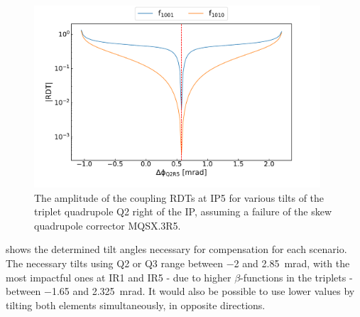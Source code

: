 \begin{figure}[!htb]
    \centering
    \includegraphics*[width=0.95\textwidth]{Figures/IR_Coupling_Correction/ir5_compensate_right_with_q2.pdf}
    \caption{The amplitude of the coupling RDTs at IP\num{5} for various tilts of the triplet quadrupole Q\num{2} right of the IP, assuming a failure of the skew quadrupole corrector MQSX.\num{3}R\num{5}.}
    \label{figure:ir5_compensate_right_with_q2}
\end{figure}

 shows the determined tilt angles necessary for compensation for each scenario.
The necessary tilts using Q\num{2} or Q\num{3} range between \num{-2} and \qty{2.85}{\milli\radian}, with the most impactful ones at IR\num{1} and IR\num{5} - due to higher \(\beta\)-functions in the triplets - between \num{-1.65} and \qty{2.325}{\milli\radian}.
It would also be possible to use lower values by tilting both elements simultaneously, in opposite directions.


